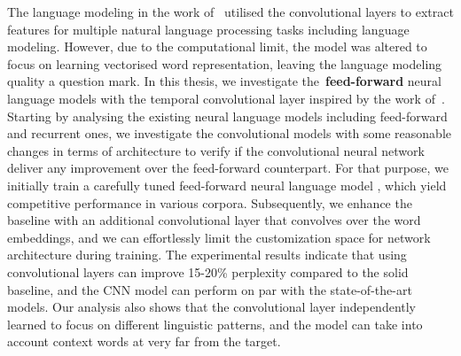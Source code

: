 The language modeling in the work of~ utilised the convolutional layers to extract features for multiple natural language processing tasks including language modeling. However, due to the computational limit, the model was altered to focus on learning vectorised word representation, leaving the language modeling quality a question mark. In this thesis, we investigate the~\textbf{feed-forward} neural language models with the temporal convolutional layer inspired by the work of~\cite{collobert2011natural}. Starting by analysing the existing neural language models including feed-forward and recurrent ones, we investigate the convolutional models with some reasonable changes in terms of architecture to verify if the convolutional neural network deliver any improvement over the feed-forward counterpart. For that purpose, we initially train a carefully tuned feed-forward neural language model , which yield competitive performance in various corpora. Subsequently, we enhance the baseline with an additional convolutional layer that convolves over the word embeddings, and we can effortlessly limit the customization space for network architecture during training. The experimental results indicate that using convolutional layers can improve 15-20\% perplexity compared to the solid baseline, and the CNN model can perform on par with the state-of-the-art models. Our analysis also shows that the convolutional layer independently learned to focus on different linguistic patterns, and the model can take into account context words at very far from the target. 




